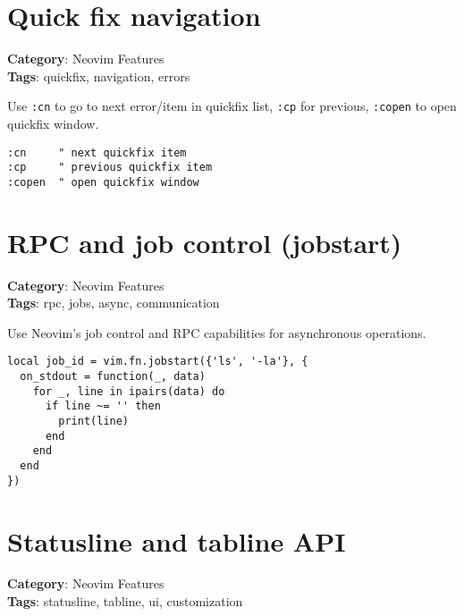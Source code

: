 {{{{{{{{{{\section{Quick fix navigation}

\textbf{Category}: Neovim Features\\ \textbf{Tags}: quickfix, navigation, errors
\vspace{0.5cm}

Use {\footnotesize \Verb§:cn§} to go to next error/item in quickfix list, {\footnotesize \Verb§:cp§} for previous, {\footnotesize \Verb§:copen§} to open quickfix window.

\begin{Exa*}{}
\begin{Verbatim}[fontsize=\footnotesize, breaklines, breakanywhere]
:cn     " next quickfix item
:cp     " previous quickfix item
:copen  " open quickfix window
\end{Verbatim}
\end{Exa*}

\section{RPC and job control (jobstart)}

\textbf{Category}: Neovim Features\\ \textbf{Tags}: rpc, jobs, async, communication
\vspace{0.5cm}

Use Neovim's job control and RPC capabilities for asynchronous operations.

\begin{Exa*}{}
\begin{Verbatim}[fontsize=\footnotesize, breaklines, breakanywhere]
local job_id = vim.fn.jobstart({'ls', '-la'}, {
  on_stdout = function(_, data)
    for _, line in ipairs(data) do
      if line ~= '' then
        print(line)
      end
    end
  end
})
\end{Verbatim}
\end{Exa*}

\section{Statusline and tabline API}

\textbf{Category}: Neovim Features\\ \textbf{Tags}: statusline, tabline, ui, customization
\vspace{0.5cm}

}}}}}}}}}}
